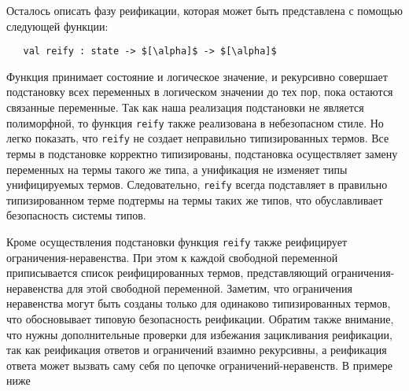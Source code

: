 
Осталось описать фазу реификации, которая может быть представлена с помощью следующей функции:

\begin{lstlisting}
   val reify : state -> $[\alpha]$ -> $[\alpha]$
\end{lstlisting}

Функция принимает состояние и логическое значение, и рекурсивно совершает подстановку всех переменных в логическом значении до тех пор, пока остаются связанные переменные. Так как наша реализация подстановки не является полиморфной, то функция \lstinline|reify| также реализована в небезопасном стиле.
Но легко показать, что \lstinline|reify| не создает неправильно типизированных термов.
Все термы в подстановке корректно типизированы, подстановка осуществляет замену переменных на термы такого же типа, а унификация не изменяет типы унифицируемых термов.
Следовательно, \lstinline|reify| всегда подставляет в правильно типизированном терме подтермы на термы таких же типов, что обуславливает безопасность системы типов.


Кроме осуществления подстановки функция  \lstinline|reify| также реифицирует ограничения-неравенства.
При этом к каждой свободной переменной приписывается список реифицированных термов, представляющий ограничения-неравенства для этой свободной переменной.
Заметим, что ограничения неравенства могут быть созданы только для одинаково типизированных термов, что обосновывает типовую безопасность реификации.
Обратим также внимание, что нужны дополнительные проверки для избежания зацикливания реификации, так как реификация ответов и ограничений взаимно рекурсивны, а реификация ответа может вызвать саму себя по цепочке ограничений-неравенств. В примере ниже

